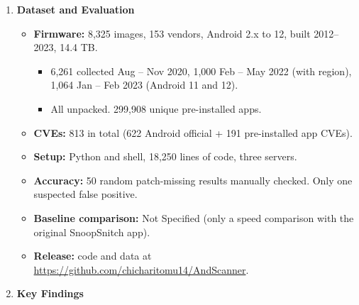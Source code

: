 \documentclass[11pt,a4paper]{article}
\newcommand{\entrypart}[1]{\textbf{\color{accent}#1}\par\vspace{2pt}}
\begin{document}
\begin{enumerate}
\begin{itemize}
\begin{itemize}
            \begin{itemize}
                \item F1 exported components, F2 debuggable, F3 requestLegacyExternalStorage, F4 networkSecurityConfig, F5 allowBackup, F6 sharedUserId.
                \item High-risk crypto misuse rules from CryptoGuard.
            \end{itemize}
            \item App source (AOSP, vendor, third party) from signatures.
        \end{itemize}
        \item \textbf{Exploit check:} apps found on own devices, scanned with a drozer-based tool, PoCs built.
    \end{itemize}

    \item \entrypart{Dataset and Evaluation}

    \begin{itemize}
        \item \textbf{Firmware:} 8,325 images, 153 vendors, Android 2.x to 12, built 2012--2023, 14.4 TB.
        \begin{itemize}
            \item 6,261 collected Aug -- Nov 2020, 1,000 Feb -- May 2022 (with region), 1,064 Jan -- Feb 2023 (Android 11 and 12).
            \item All unpacked. 299,908 unique pre-installed apps.
        \end{itemize}
        \item \textbf{CVEs:} 813 in total (622 Android official + 191 pre-installed app CVEs).
        \item \textbf{Setup:} Python and shell, 18,250 lines of code, three servers.
        \item \textbf{Accuracy:} 50 random patch-missing results manually checked. Only one suspected false positive.
        \item \textbf{Baseline comparison:} Not Specified (only a speed comparison with the original SnoopSnitch app).
        \item \textbf{Release:} code and data at \url{https://github.com/chicharitomu14/AndScanner}.
    \end{itemize}

    \item \entrypart{Key Findings}


\end{enumerate}
\end{document}
